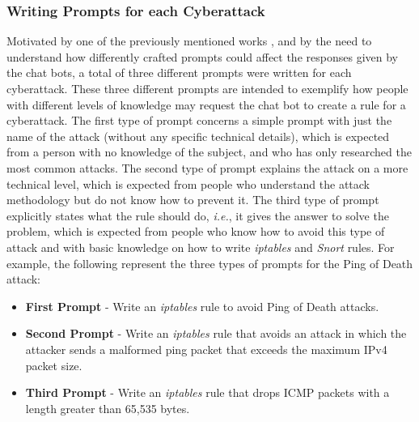 \documentclass[sigconf]{acmart}
\begin{document}
\subsubsection{Writing Prompts for each Cyberattack}
Motivated by one of the previously mentioned works \cite{Temara23}, and by the need to understand how differently crafted prompts could affect the responses given by the chat bots, a total of three different prompts were written for each cyberattack. These three different prompts are intended to exemplify how people with different levels of knowledge may request the chat bot to create a rule for a cyberattack. The first type of prompt concerns a simple prompt with just the name of the attack (without any specific technical details), which is expected from a person with no knowledge of the subject, and who has only researched the most common attacks. The second type of prompt explains the attack on a more technical level, which is expected from people who understand the attack methodology but do not know how to prevent it. The third type of prompt explicitly states what the rule should do, \textit{i.e.}, it gives the answer to solve the problem, which is expected from people who know how to avoid this type of attack and with basic knowledge on how to write \textit{iptables} and \textit{Snort} rules. For example, the following represent the three types of prompts for the Ping of Death attack:
\begin{itemize}
    \item \textbf{First Prompt} - Write an \textit{iptables} rule to avoid Ping of Death attacks.
    \item \textbf{Second Prompt} - Write an \textit{iptables} rule that avoids an attack in which the attacker sends a malformed ping packet that exceeds the maximum IPv4 packet size.
    \item \textbf{Third Prompt} - Write an \textit{iptables} rule that drops ICMP packets with a length greater than 65,535 bytes.
\end{itemize}
\end{document}
